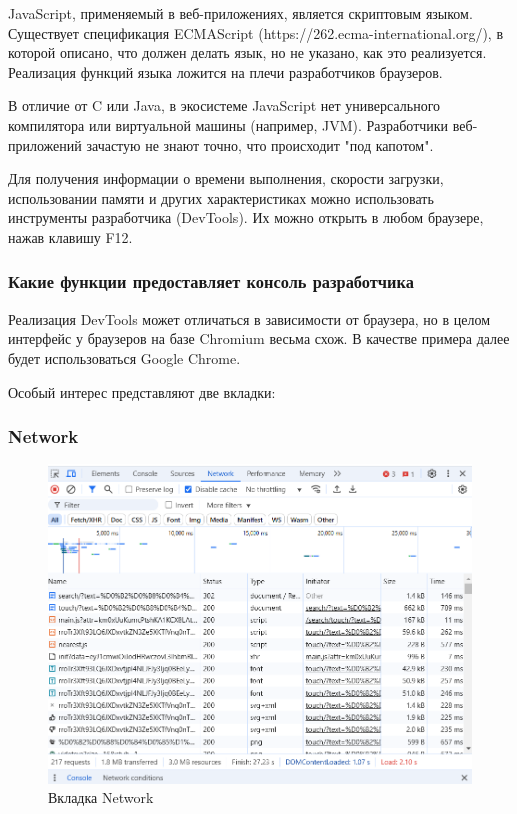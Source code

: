 \documentclass[12pt]{article}
\begin{document}
JavaScript, применяемый в веб-приложениях, является скриптовым языком.
Существует спецификация ECMAScript (https://262.ecma-international.org/),
в которой описано, что должен делать язык, но не указано, как это реализуется.
Реализация функций языка ложится на плечи разработчиков браузеров.

В отличие от C или Java, в экосистеме JavaScript нет универсального компилятора
или виртуальной машины (например, JVM).
Разработчики веб-приложений зачастую не знают точно, что происходит "под капотом".

Для получения информации о времени выполнения, скорости загрузки,
использовании памяти и других характеристиках можно использовать инструменты разработчика (DevTools).
Их можно открыть в любом браузере, нажав клавишу F12.

\subsubsection{Какие функции предоставляет консоль разработчика}

Реализация DevTools может отличаться в зависимости от браузера,
но в целом интерфейс у браузеров на базе Chromium весьма схож.
В качестве примера далее будет использоваться Google Chrome.

Особый интерес представляют две вкладки:

\subsubsection{Network}

\begin{figure}[H]
    \centering
    \includegraphics[width=1\textwidth]{../images/network.png}
    \caption{Вкладка Network}
\end{figure}
\end{document}
